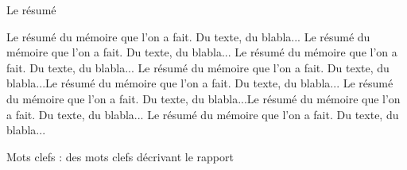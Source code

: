 

Le résumé

Le résumé du mémoire que l'on a fait. Du texte, du blabla... Le résumé du mémoire que l'on a fait. Du texte, du blabla... Le résumé du mémoire que l'on a fait. Du texte, du blabla... Le résumé du mémoire que l'on a fait. Du texte, du blabla...Le résumé du mémoire que l'on a fait. Du texte, du blabla... Le résumé du mémoire que l'on a fait. Du texte, du blabla...Le résumé du mémoire que l'on a fait. Du texte, du blabla... Le résumé du mémoire que l'on a fait. Du texte, du blabla...


Mots clefs : des mots clefs décrivant le rapport
